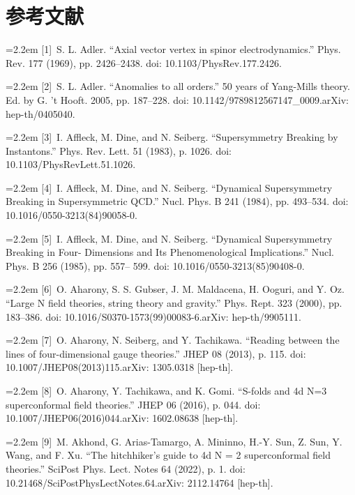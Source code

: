 \chapter*{参考文献}
\begingroup
\small
\setlength{\parindent}{0pt}
\setlength{\parskip}{3pt}
\noindent\hangindent=2.2em [1]\ S. L. Adler. “Axial vector vertex in spinor electrodynamics.” Phys. Rev. 177 (1969), pp. 2426--2438. doi: 10.1103/PhysRev.177.2426.\par
\noindent\hangindent=2.2em [2]\ S. L. Adler. “Anomalies to all orders.” 50 years of Yang-Mills theory. Ed. by G. ’t Hooft. 2005, pp. 187--228. doi: 10.1142/9789812567147\_0009.arXiv: hep-th/0405040.\par
\noindent\hangindent=2.2em [3]\ I. Affleck, M. Dine, and N. Seiberg. “Supersymmetry Breaking by Instantons.” Phys. Rev. Lett. 51 (1983), p. 1026. doi: 10.1103/PhysRevLett.51.1026.\par
\noindent\hangindent=2.2em [4]\ I. Affleck, M. Dine, and N. Seiberg. “Dynamical Supersymmetry Breaking in Supersymmetric QCD.” Nucl. Phys. B 241 (1984), pp. 493--534. doi: 10.1016/0550-3213(84)90058-0.\par
\noindent\hangindent=2.2em [5]\ I. Affleck, M. Dine, and N. Seiberg. “Dynamical Supersymmetry Breaking in Four- Dimensions and Its Phenomenological Implications.” Nucl. Phys. B 256 (1985), pp. 557-- 599. doi: 10.1016/0550-3213(85)90408-0.\par
\noindent\hangindent=2.2em [6]\ O. Aharony, S. S. Gubser, J. M. Maldacena, H. Ooguri, and Y. Oz. “Large N field theories, string theory and gravity.” Phys. Rept. 323 (2000), pp. 183--386. doi: 10.1016/S0370-1573(99)00083-6.arXiv: hep-th/9905111.\par
\noindent\hangindent=2.2em [7]\ O. Aharony, N. Seiberg, and Y. Tachikawa. “Reading between the lines of four-dimensional gauge theories.” JHEP 08 (2013), p. 115. doi: 10.1007/JHEP08(2013)115.arXiv: 1305.0318 [hep-th].\par
\noindent\hangindent=2.2em [8]\ O. Aharony, Y. Tachikawa, and K. Gomi. “S-folds and 4d N=3 superconformal field theories.” JHEP 06 (2016), p. 044. doi: 10.1007/JHEP06(2016)044.arXiv: 1602.08638 [hep-th].\par
\noindent\hangindent=2.2em [9]\ M. Akhond, G. Arias-Tamargo, A. Mininno, H.-Y. Sun, Z. Sun, Y. Wang, and F. Xu. “The hitchhiker’s guide to 4d N = 2 superconformal field theories.” SciPost Phys. Lect. Notes 64 (2022), p. 1. doi: 10.21468/SciPostPhysLectNotes.64.arXiv: 2112.14764 [hep-th].\par
